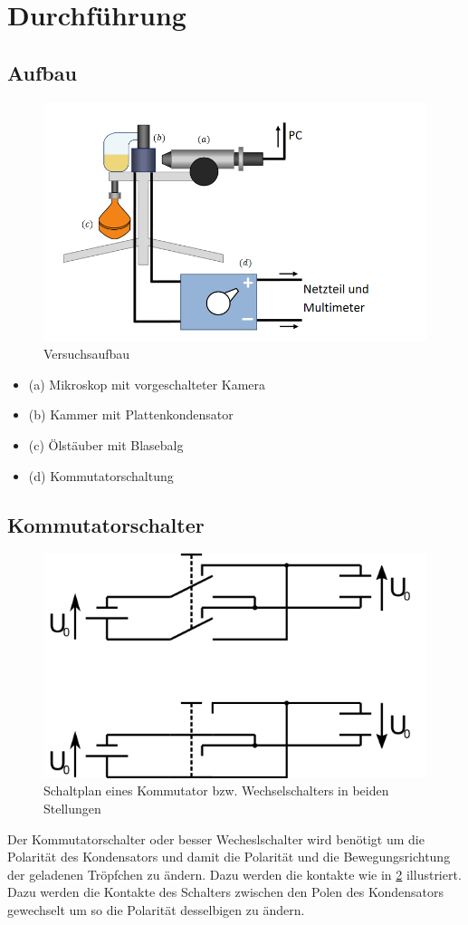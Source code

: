\documentclass{scrartcl}
\begin{document}
\section{Durchführung}
	\subsection{Aufbau}
		\begin{figure}[H]
			\centering
			\includegraphics[width=1.0\textwidth]{Versuchsaufbau.PNG}
			\caption{Versuchsaufbau}
			\label{versuchsaufbau}
		\end{figure}
		\begin{itemize}
			\item (a) Mikroskop mit vorgeschalteter Kamera
			\item (b) Kammer mit Plattenkondensator
			\item (c) Ölstäuber mit Blasebalg
			\item (d) Kommutatorschaltung
		\end{itemize}
	\subsection{Kommutatorschalter}
		\begin{figure}[H]
			\centering
			\includegraphics[width=.5\textwidth]{kommutator.png} 
			\caption{Schaltplan eines Kommutator bzw. Wechselschalters in beiden Stellungen}
			\label{Kommutator} 
		\end{figure}
		Der Kommutatorschalter oder besser Wecheslschalter wird benötigt um die Polarität des Kondensators und damit die Polarität
		und die Bewegungsrichtung der geladenen Tröpfchen zu ändern. Dazu werden die kontakte wie in \ref{Kommutator} illustriert.
		Dazu werden die Kontakte des Schalters zwischen den Polen des Kondensators gewechselt um so die Polarität desselbigen zu ändern.
\end{document}
